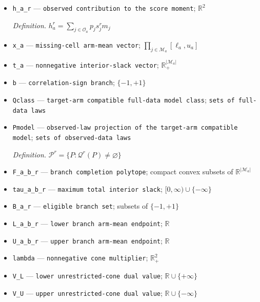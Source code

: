 \documentclass{article}
\begin{document}
\begin{itemize}
  \item \texttt{h\_\allowbreak{}a\_\allowbreak{}r} --- \texttt{observed contribution to the score moment}; \(\mathbb R^2\)
  \par\smallskip\noindent\emph{Definition.} \(h_a^r=\sum_{j\in\mathcal O_a}p_js_j^rm_j\)
  \item \texttt{x\_\allowbreak{}a} --- \texttt{missing-\allowbreak{}cell arm-\allowbreak{}mean vector}; \(\prod_{j\in\mathcal M_a}[\ell_a,u_a]\)
  \item \texttt{t\_\allowbreak{}a} --- \texttt{nonnegative interior-\allowbreak{}slack vector}; \(\mathbb R_+^{|\mathcal M_a|}\)
  \item \texttt{b} --- \texttt{correlation-\allowbreak{}sign branch}; \(\{-1,+1\}\)
  \item \texttt{Qclass} --- \texttt{target-\allowbreak{}arm compatible full-\allowbreak{}data model class}; \texttt{sets of full-\allowbreak{}data laws}
  \item \texttt{Pmodel} --- \texttt{observed-\allowbreak{}law projection of the target-\allowbreak{}arm compatible model}; \texttt{sets of observed-\allowbreak{}data laws}
  \par\smallskip\noindent\emph{Definition.} \(\mathcal P^r=\{P:\mathcal Q^r(P)\ne\varnothing\}\)
  \item \texttt{F\_\allowbreak{}a\_\allowbreak{}b\_\allowbreak{}r} --- \texttt{branch completion polytope}; compact convex subsets of \(\mathbb R^{|\mathcal M_a|}\)
  \item \texttt{tau\_\allowbreak{}a\_\allowbreak{}b\_\allowbreak{}r} --- \texttt{maximum total interior slack}; \([0,\infty)\cup\{-\infty\}\)
  \item \texttt{B\_\allowbreak{}a\_\allowbreak{}r} --- \texttt{eligible branch set}; subsets of \(\{-1,+1\}\)
  \item \texttt{L\_\allowbreak{}a\_\allowbreak{}b\_\allowbreak{}r} --- \texttt{lower branch arm-\allowbreak{}mean endpoint}; \(\mathbb R\)
  \item \texttt{U\_\allowbreak{}a\_\allowbreak{}b\_\allowbreak{}r} --- \texttt{upper branch arm-\allowbreak{}mean endpoint}; \(\mathbb R\)
  \item \texttt{lambda} --- \texttt{nonnegative cone multiplier}; \(\mathbb R_+^2\)
  \item \texttt{V\_\allowbreak{}L} --- \texttt{lower unrestricted-\allowbreak{}cone dual value}; \(\mathbb R\cup\{+\infty\}\)
  \item \texttt{V\_\allowbreak{}U} --- \texttt{upper unrestricted-\allowbreak{}cone dual value}; \(\mathbb R\cup\{-\infty\}\)

\end{itemize}
\end{document}
